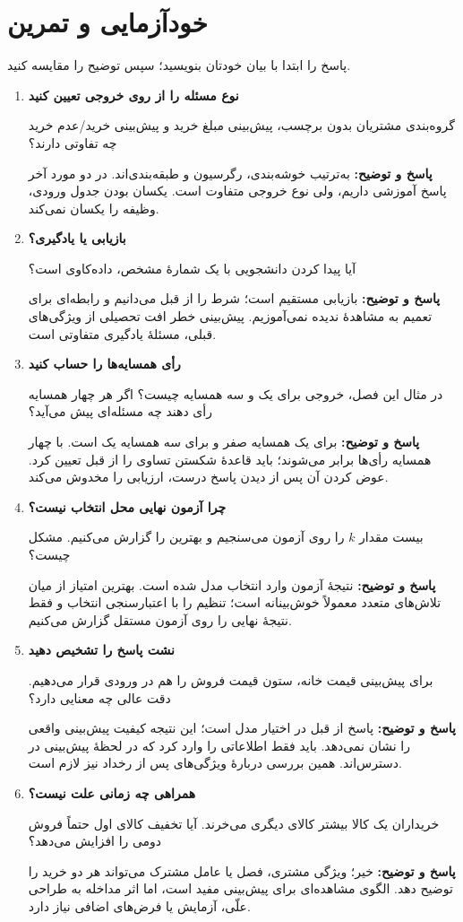 \documentclass[12pt,a4paper,oneside]{report}
\newcounter{ex}[chapter]
\newenvironment{selftests}{\begin{enumerate}\setlength{\itemsep}{9pt}}{\end{enumerate}}
\newenvironment{selftest}[1]{\item\textbf{#1}\par}{\par}
\newcommand{\answer}[1]{\par{\color{teal}\bfseries پاسخ و توضیح: }#1\par}
\begin{document}
\section{خودآزمایی و تمرین}
پاسخ را ابتدا با بیان خودتان بنویسید؛ سپس توضیح را مقایسه کنید.
\begin{selftests}
\begin{selftest}{نوع مسئله را از روی خروجی تعیین کنید}
گروه‌بندی مشتریان بدون برچسب، پیش‌بینی مبلغ خرید و پیش‌بینی خرید/عدم خرید چه تفاوتی دارند؟
\answer{به‌ترتیب خوشه‌بندی، رگرسیون و طبقه‌بندی‌اند. در دو مورد آخر پاسخ آموزشی داریم، ولی نوع خروجی متفاوت است. یکسان بودن جدول ورودی، وظیفه را یکسان نمی‌کند.}
\end{selftest}
\begin{selftest}{بازیابی یا یادگیری؟}
آیا پیدا کردن دانشجویی با یک شمارهٔ مشخص، داده‌کاوی است؟
\answer{بازیابی مستقیم است؛ شرط را از قبل می‌دانیم و رابطه‌ای برای تعمیم به مشاهدهٔ ندیده نمی‌آموزیم. پیش‌بینی خطر افت تحصیلی از ویژگی‌های قبلی، مسئلهٔ یادگیری متفاوتی است.}
\end{selftest}
\begin{selftest}{رأی همسایه‌ها را حساب کنید}
در مثال این فصل، خروجی برای یک و سه همسایه چیست؟ اگر هر چهار همسایه رأی دهند چه مسئله‌ای پیش می‌آید؟
\answer{برای یک همسایه صفر و برای سه همسایه یک است. با چهار همسایه رأی‌ها برابر می‌شوند؛ باید قاعدهٔ شکستن تساوی را از قبل تعیین کرد. عوض کردن آن پس از دیدن پاسخ درست، ارزیابی را مخدوش می‌کند.}
\end{selftest}
\begin{selftest}{چرا آزمون نهایی محل انتخاب نیست؟}
بیست مقدار $k$ را روی آزمون می‌سنجیم و بهترین را گزارش می‌کنیم. مشکل چیست؟
\answer{نتیجهٔ آزمون وارد انتخاب مدل شده است. بهترین امتیاز از میان تلاش‌های متعدد معمولاً خوش‌بینانه است؛ تنظیم را با اعتبارسنجی انتخاب و فقط نتیجهٔ نهایی را روی آزمون مستقل گزارش می‌کنیم.}
\end{selftest}
\begin{selftest}{نشت پاسخ را تشخیص دهید}
برای پیش‌بینی قیمت خانه، ستون قیمت فروش را هم در ورودی قرار می‌دهیم. دقت عالی چه معنایی دارد؟
\answer{پاسخ از قبل در اختیار مدل است؛ این نتیجه کیفیت پیش‌بینی واقعی را نشان نمی‌دهد. باید فقط اطلاعاتی را وارد کرد که در لحظهٔ پیش‌بینی در دسترس‌اند. همین بررسی دربارهٔ ویژگی‌های پس از رخداد نیز لازم است.}
\end{selftest}
\begin{selftest}{همراهی چه زمانی علت نیست؟}
خریداران یک کالا بیشتر کالای دیگری می‌خرند. آیا تخفیف کالای اول حتماً فروش دومی را افزایش می‌دهد؟
\answer{خیر؛ ویژگی مشتری، فصل یا عامل مشترک می‌تواند هر دو خرید را توضیح دهد. الگوی مشاهده‌ای برای پیش‌بینی مفید است، اما اثر مداخله به طراحی علّی، آزمایش یا فرض‌های اضافی نیاز دارد.}
\end{selftest}
\end{selftests}
\end{document}
